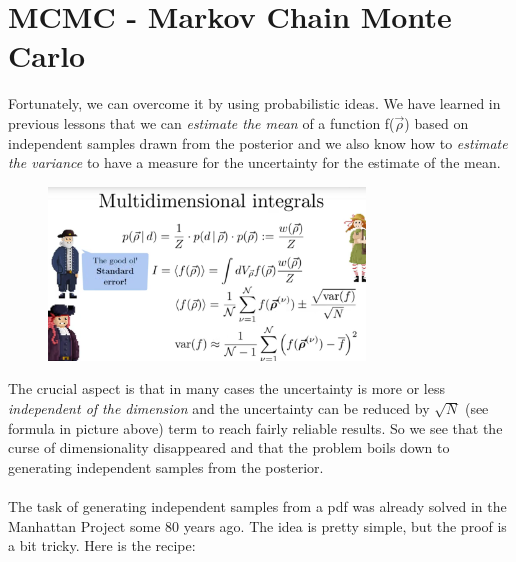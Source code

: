 \documentclass[12pt, a4paper]{scrartcl}
\begin{document}
\section*{MCMC - Markov Chain Monte Carlo}
Fortunately, we can overcome it by using probabilistic ideas. We have learned
in previous lessons that we can \textit{estimate the mean} of a function f($\vec{\rho}$) based on independent samples drawn from the posterior
and we also know how to \textit{estimate the variance}
to have a measure for the uncertainty for the estimate of the mean.\\%
 \begin{figure}[H]
	\centering
	\includegraphics[width=0.75\textwidth]{9_5.png}
\end{figure}

The crucial aspect is that in many cases the uncertainty is more or less
\textit{independent of the dimension} and the uncertainty can be reduced by $\sqrt{N}$ (see formula in picture above) term to reach fairly reliable results. 
So we see that
the curse of dimensionality disappeared and that the problem boils down to
generating independent samples from the posterior.\\

\\

The task of generating independent samples from a pdf was already
solved in the Manhattan Project some 80 years ago. The idea is pretty
simple, but the proof is a bit tricky. Here is the recipe:\\
\end{document}
